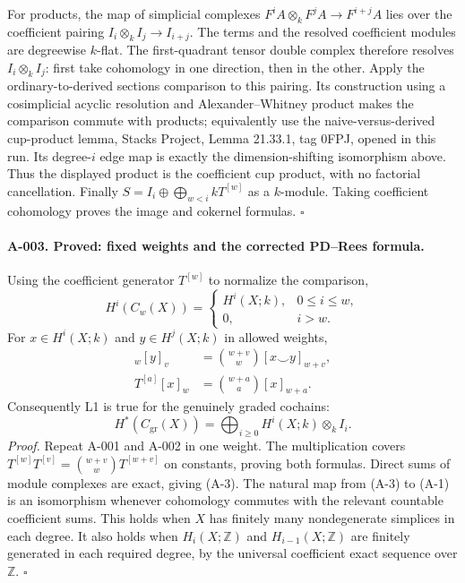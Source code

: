 For products, the map of simplicial complexes
$F^iA\otimes_k F^jA\to F^{i+j}A$ lies over the coefficient pairing
$I_i\otimes_k I_j\to I_{i+j}$. The terms and the resolved coefficient
modules are degreewise $k$-flat. The first-quadrant tensor double
complex therefore resolves $I_i\otimes_k I_j$: first take cohomology
in one direction, then in the other. Apply the ordinary-to-derived
sections comparison to this pairing. Its construction using a
cosimplicial acyclic resolution and Alexander--Whitney product makes
the comparison commute with products; equivalently use the
naive-versus-derived cup-product lemma, Stacks Project, Lemma 21.33.1,
tag 0FPJ, opened in this run. Its degree-$i$ edge map is exactly the
dimension-shifting isomorphism above. Thus the displayed product is
the coefficient cup product, with no factorial cancellation.
Finally $S=I_i\oplus\bigoplus_{w<i}kT^{[w]}$ as a $k$-module.
Taking coefficient cohomology proves the image and cokernel formulas.
\hfill$\square$

\paragraph{A-003. Proved: fixed weights and the corrected PD--Rees formula.}
Using the coefficient generator $T^{[w]}$ to normalize the comparison,
\[
 H^i(C_w(X))=\begin{cases}H^i(X;k),&0\leq i\leq w,\\0,&i>w.
 \end{cases}
\]
For $x\in H^i(X;k)$ and $y\in H^j(X;k)$ in allowed weights,
\begin{align*}
 [x]_w[y]_v&=\binom{w+v}{w}[x\smile y]_{w+v},\\
 T^{[a]}[x]_w&=\binom{w+a}{a}[x]_{w+a}.
 \tag{A-2}\label{eq:weights}
\end{align*}
Consequently L1 is true for the genuinely graded cochains:
\[
 H^*(C_{\mathrm{gr}}(X))=
 \bigoplus_{i\geq0}H^i(X;k)\otimes_k I_i.
 \tag{A-3}
\]
\emph{Proof.}
Repeat A-001 and A-002 in one weight. The multiplication covers
$T^{[w]}T^{[v]}=\binom{w+v}{w}T^{[w+v]}$ on constants, proving
both formulas. Direct sums of module complexes are exact, giving
(A-3). The natural map from (A-3) to (A-1) is an isomorphism whenever
cohomology commutes with the relevant countable coefficient sums.
This holds when $X$ has finitely many nondegenerate simplices in each
degree. It also holds when $H_i(X;\mathbb Z)$ and
$H_{i-1}(X;\mathbb Z)$ are finitely generated in each required degree,
by the universal coefficient exact sequence over $\mathbb Z$.
\hfill$\square$


